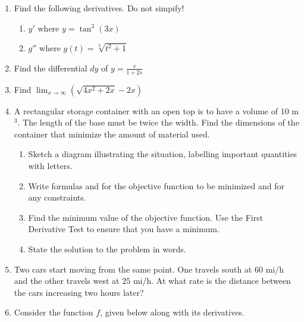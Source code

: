 \documentclass[12pt]{article}
\newcommand{\ds}{\displaystyle}
\begin{document}
\begin{enumerate}
\item Find the following derivatives.  Do not simpify!
  \begin{enumerate}
  \item $\ds y'$
    where 
    $\ds y = \tan^2 (3x)$
\vfill
  \item $\ds g''$
    where 
    $\ds g(t)=\sqrt[3]{t^2+1}$
\vfill
  \end{enumerate}
\newpage
\item Find
  the differential $dy$ of 
  $\ds y=\frac{s}{1+2s}$
\vfill
\item Find 
  $\ds \lim_{x\to \infty} \left(\sqrt{4x^2+2x}-2x\right)$
\vfill
\newpage
\item A rectangular storage container with an open
  top is to have a volume of $10$ m$^3$.  The length of the base must be
  twice
  the width.  Find the dimensions of the container that minimize the
  amount of material used.
  \begin{enumerate}
  \item Sketch a diagram illustrating the situation, labelling important
    quantities with letters.
\vfill
\vfill
  \item Write formulas and for the objective function
    to be minimized and for any constraints.
\vfill
\vfill
  \item Find the minimum value of the objective function.  Use the First
    Derivative Test to ensure that you have a minimum.
\vfill
\vfill
  \item State the solution to the problem in words.
\vfill
  \end{enumerate}
\newpage
\item Two 
  cars start moving from the same point.  One travels 
  south at $60$ mi/h
  and the other travels 
  west at $25$ mi/h. 
  At what rate is the distance
  between the cars increasing two hours later?
\vfill
\newpage
\item Consider
  the function $f$, given below along with its derivatives.

\end{enumerate}
\end{document}
